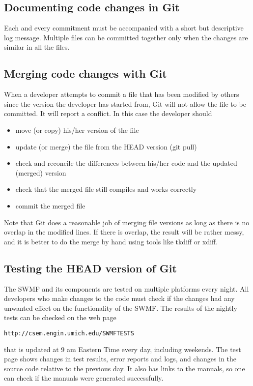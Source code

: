 \documentclass{article}
\begin{document}
\subsection{Documenting code changes in Git}

Each and every commitment must be accompanied with a short but descriptive 
log message. Multiple files can be committed together only when the changes
are similar in all the files.

\subsection{Merging code changes with Git}

When a developer attempts to commit a file that has been modified by others
since the version the developer has started from, Git will not allow the file
to be committed. It will report a conflict. In this case the developer should 
\begin{itemize}
\item move (or copy) his/her version of the file
\item update (or merge) the file from the HEAD version (git pull)
\item check and reconcile the differences between his/her code and 
      the updated (merged) version
\item check that the merged file still compiles and works correctly
\item commit the merged file
\end{itemize}
Note that Git does a reasonable job of merging file versions as long as there
is no overlap in the modified lines. If there is overlap, the result will be
rather messy, and it is better to do the merge by hand using tools like 
tkdiff or xdiff.

\subsection{Testing the HEAD version of Git}


The SWMF and its components are tested on multiple platforms every night.
All developers who make changes to the code must check if the changes had
any unwanted effect on the functionality of the SWMF. The results of the
nightly tests can be checked on the web page
\begin{verbatim}
http://csem.engin.umich.edu/SWMFTESTS
\end{verbatim}
that is updated at 9 am Eastern Time every day, including weekends. The
test page shows changes in test results, error reports and logs, and 
changes in the source code relative to the previous day. It also has links
to the manuals, so one can check if the manuals were generated successfully.
\end{document}
